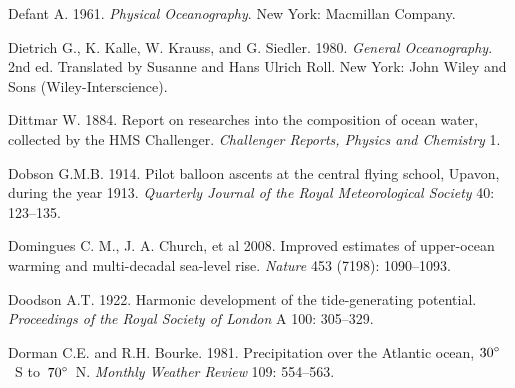 \begin{thebibliography}{999}
Defant A.  1961. \textit{Physical Oceanography}. New York: Macmillan
Company.
%

Dietrich G., K. Kalle, W. Krauss, and
G. Siedler. 1980. \textit{General Oceanography}. 2nd ed. Translated by
Susanne and Hans Ulrich Roll. New York: John Wiley and Sons
(Wiley-Interscience).
%

Dittmar W.  1884. Report on researches into the composition of ocean
water, collected by the HMS Challenger. \textit{Challenger Reports,
  Physics and Chemistry} 1.
%

Dobson G.M.B.  1914. Pilot balloon ascents at the central flying
school, Upavon, during the year 1913. \textit{Quarterly Journal of the
  Royal Meteorological Society} 40: 123--135.
%

Domingues C. M., J. A. Church, et al 2008. Improved estimates of
upper-ocean warming and multi-decadal sea-level rise. \textit{Nature}
453 (7198): 1090--1093.
%

Doodson A.T.  1922. Harmonic development of the tide-generating
potential. \textit{Proceedings of the Royal Society of London} A 100:
305--329.
%

Dorman C.E. and R.H. Bourke.  1981. Precipitation over the Atlantic
ocean, ${30}^\circ$~S to~${70}^\circ$~N. \textit{Monthly Weather
  Review} 109: 554--563.
%


\end{thebibliography}
